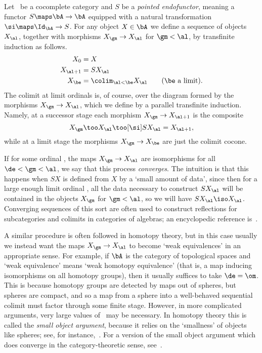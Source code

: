 \documentclass[12pt]{amsart}
\begin{document}
\begin{eg}\label{thm:soa}
  Let \bA\ be a cocomplete category and $S$ be a \emph{pointed
    endofunctor}, meaning a functor $S\maps \bA\to\bA$ equipped with
  a natural transformation $\si\maps \Id_\bA \to S$.  For any object
  $X\in \bA$ we define a sequence of objects $X_\al$, together with
  morphisms $X_\gm\to X_\al$ for $\gm<\al$, by transfinite induction
  as follows.
  \begin{align*}
    X_0 &= X\\
    X_{\al+1} &= S X_\al\\
    X_{\be} &= \colim_{\al<\be} X_\al \qquad\text{($\be$ a limit)}.
  \end{align*}
  The colimit at limit ordinals is, of course, over the diagram
  formed by the morphisms $X_\gm\to X_\al$, which we define by a
  parallel transfinite induction.  Namely, at a successor stage each
  morphism $X_\gm \to X_{\al+1}$ is the composite
  \[X_\gm \too X_\al \too[\si] SX_\al= X_{\al+1},
  \]
  while at a limit stage the morphisms $X_\gm \to X_{\be}$ are just
  the colimit cocone.

  If for some ordinal \de, the maps $X_\gm\to X_\al$ are isomorphisms
  for all $\de<\gm<\al$, we say that this process \emph{converges}.
  The intuition is that this happens when $SX$ is defined from $X$ by
  a `small amount of data', since then for a large enough limit
  ordinal \al, all the data necessary to construct $SX_\al$ will be
  contained in the objects $X_\gm$ for $\gm<\al$, so we will have
  $SX_\al\iso X_\al$.  Converging sequences of this sort are often
  used to construct reflections for subcategories and colimits in
  categories of algebras; an encyclopedic reference
  is~\cite{kelly:transfinite,kelly:transfinite-add}.

  A similar procedure is often followed in homotopy theory, but in
  this case usually we instead want the maps $X_\gm\to X_\al$ to
  become `weak equivalences' in an appropriate sense.  For example, if
  $\bA$ is the category of topological spaces and `weak equivalence'
  means `weak homotopy equivalence' (that is, a map inducing
  isomorphisms on all homotopy groups), then it usually suffices to
  take $\de=\om$.  This is because homotopy groups are detected by
  maps out of spheres, but spheres are compact, and so a map from a
  sphere into a well-behaved sequential colimit must factor through
  some finite stage.  However, in more complicated arguments, very
  large values of \de\ may be necessary.  In homotopy theory this is
  called the \emph{small object argument}, because it relies on the
  `smallness' of objects like spheres; see, for
  instance,~\cite{hovey:modelcats}.  For a version of the small object
  argument which does converge in the category-theoretic sense,
  see~\cite{garner:soa}.
\end{eg}
\end{document}
